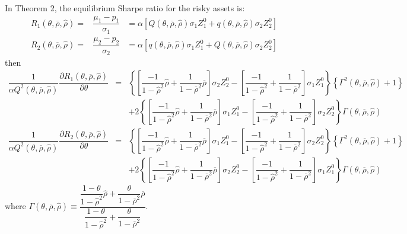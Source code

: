 \documentclass[10pt]{article}
\begin{document}
\quad
In Theorem 2, the equilibrium Sharpe ratio for the risky assets is:
{\footnotesize \begin{eqnarray*}
R_1 (\theta, \overline{\rho}, {\hat \rho}) = & \dfrac{\mu_1 - p_1}{\sigma_1} & = \alpha \left[ Q (\theta, \overline{\rho}, {\hat \rho}) \sigma_1 Z_1^0 + q (\theta, \overline{\rho}, {\hat \rho}) \sigma_2 Z_2^0 \right] \\
R_2 (\theta, \overline{\rho}, {\hat \rho}) = & \dfrac{\mu_2 - p_2}{\sigma_2} & = \alpha \left[ q (\theta, \overline{\rho}, {\hat \rho}) \sigma_1 Z_1^0 + Q (\theta, \overline{\rho}, {\hat \rho}) \sigma_2 Z_2^0 \right]
\end{eqnarray*}}
then
{\footnotesize \begin{eqnarray*}
\dfrac{1}{\alpha Q^2 (\theta, \overline{\rho}, {\hat \rho})} \dfrac{\partial R_1 (\theta, \overline{\rho}, {\hat \rho})}{\partial \theta} & = & \left\{ \left[ \dfrac{- 1}{1 - {\hat \rho}^2} {\hat \rho} + \dfrac1{1 - \overline{\rho}^2} \overline{\rho} \right] \sigma_2 Z_2^0 - \left[ \dfrac{- 1}{1 - {\hat \rho}^2} + \dfrac1{1 - \overline{\rho}^2} \right] \sigma_1 Z_1^0 \right\} \left\{ \Gamma^2 (\theta, \overline{\rho}, {\hat \rho}) + 1 \right\} \\
& & + 2 \left\{ \left[ \dfrac{- 1}{1 - {\hat \rho}^2} {\hat \rho} + \dfrac1{1 - \overline{\rho}^2} \overline{\rho} \right] \sigma_1 Z_1^0 - \left[ \dfrac{- 1}{1 - {\hat \rho}^2} + \dfrac1{1 - \overline{\rho}^2} \right] \sigma_2 Z_2^0 \right\} \Gamma (\theta, \overline{\rho}, {\hat \rho}) \\
\dfrac{1}{\alpha Q^2 (\theta, \overline{\rho}, {\hat \rho})} \dfrac{\partial R_2 (\theta, \overline{\rho}, {\hat \rho})}{\partial \theta} & = & \left\{ \left[ \dfrac{- 1}{1 - {\hat \rho}^2} {\hat \rho} + \dfrac1{1 - \overline{\rho}^2} \overline{\rho} \right] \sigma_1 Z_1^0 - \left[ \dfrac{- 1}{1 - {\hat \rho}^2} + \dfrac1{1 - \overline{\rho}^2} \right] \sigma_2 Z_2^0 \right\} \left\{ \Gamma^2 (\theta, \overline{\rho}, {\hat \rho}) + 1 \right\} \\
& & + 2 \left\{ \left[ \dfrac{- 1}{1 - {\hat \rho}^2} {\hat \rho} + \dfrac1{1 - \overline{\rho}^2} \overline{\rho} \right] \sigma_2 Z_2^0 - \left[ \dfrac{- 1}{1 - {\hat \rho}^2} + \dfrac1{1 - \overline{\rho}^2} \right] \sigma_1 Z_1^0 \right\} \Gamma (\theta, \overline{\rho}, {\hat \rho})
\end{eqnarray*}}
where {\footnotesize $ \Gamma (\theta, \overline{\rho}, {\hat \rho}) \equiv \dfrac{\dfrac{1 - \theta}{1 - {\hat \rho}^2} {\hat \rho} + \dfrac{\theta}{1 - \overline{\rho}^2} \overline{\rho}}{\dfrac{1 - \theta}{1 - {\hat \rho}^2} + \dfrac{\theta}{1 - \overline{\rho}^2}} $}.
\end{document}

